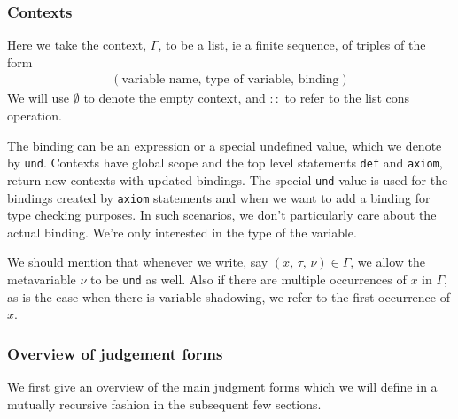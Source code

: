 \documentclass{article}
\begin{document}
\subsubsection{Contexts}
Here we take the context, $\Gamma$, to be a list, ie a finite sequence, of triples
of the form
\begin{align*}
  (\text{variable name}, \, \text{type of variable}, \, \text{binding})
\end{align*}
We will use $\emptyset$ to denote the empty context, and $::$ to refer to the
list cons operation.

The binding can be an expression or a special undefined value, which we denote by
\verb|und|.
Contexts have global scope and the top level statements \verb|def|
and \verb|axiom|, return new contexts with updated bindings.
The special \verb|und| value is used for the bindings created by \verb|axiom|
statements and when we want to add a binding for type checking purposes.
In such scenarios, we don't particularly care about the actual binding. We're
only interested in the type of the variable. 

We should mention that whenever we write, say
$(x, \, \tau, \, \nu) \in \Gamma$, we allow the metavariable $\nu$ to be 
\verb|und| as well. Also if there are multiple occurrences of $x$ in $\Gamma$,
as is the case when there is variable shadowing, we refer to the first occurrence
of $x$. 

\subsubsection{Overview of judgement forms}
We first give an overview of the main judgment forms which we will define in a
mutually recursive fashion in the subsequent few sections.
\end{document}
